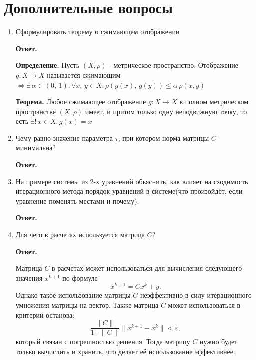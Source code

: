 \documentclass{article}
\begin{document}
    \section{Дополнительные вопросы}
    \begin{enumerate}
        \item Сформулировать теорему о сжимающем отображении
        
        {\bfseries Ответ. }

        {\bfseries Определение. } Пусть $(X, \rho)$ - метрическое пространство. Отображение 
        $g : X \rightarrow X$ называется сжимающим $\Leftrightarrow \exists \, \alpha \in (0,\, 1): \forall x, \, y \in X: \rho(g(x),\,g(y)) \leqslant \alpha \,\rho(x,y)$ 
        
        {\bfseries Теорема. } Любое сжимающее отображение $g: X \rightarrow X$ в полном 
        метрическом пространстве $(X, \rho)$ имеет, и притом только одну неподвижную точку, то есть 
        $\exists!\, x\in X: g(x) = x$ 
        \item Чему равно значение параметра $\tau$, при котором норма матрицы $C$ минимальна?
        
        {\bfseries Ответ. }

        \item На примере системы из 2-х уравнений обьяснить, как влияет на сходимость итерационного метода 
        порядок уравнений в системе(что произойдёт, если уравнение поменять местами и почему).
        
        {\bfseries Ответ. }

        \item Для чего в расчетах используется матрица $C$?
        
        {\bfseries Ответ. }

        Матрица $C$ в расчетах может использоваться для вычисления следующего значения $x^{k+1}$ по формуле
        \begin{equation*}
            x^{k+1} = C x^k +y.
        \end{equation*}
        Однако такое использование матрицы $C$ неэффективно в силу итерационного умножения матрицы на вектор.
        Также матрица $C$ может использоваться в критерии останова: 
        \begin{equation*}
            \dfrac{\|C\|}{1-\|C\|} \|x^{k+1} - x^k\| < \varepsilon,
        \end{equation*}
        который связан с погрешностью решения. Тогда матрицу $C$ нужно будет только вычислить и хранить, что делает 
        её использование эффективнее.
    \end{enumerate}

    
\end{document}
